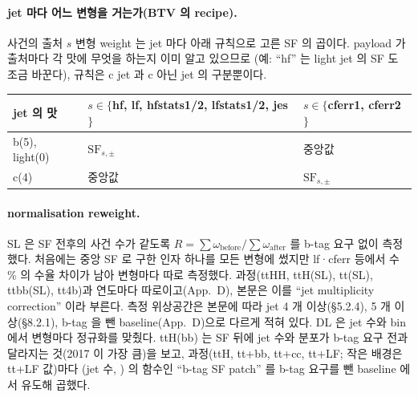 \paragraph{jet 마다 어느 변형을 거는가(BTV 의 recipe).}
사건의 출처 $s$ 변형 weight 는 jet 마다 아래 규칙으로 고른 SF 의 곱이다. payload 가 출처마다 각 맛에 무엇을 하는지 이미 알고 있으므로
(예: ``hf'' 는 light jet 의 SF 도 조금 바꾼다), 규칙은 c jet 과 c 아닌 jet 의 구분뿐이다.
\begin{center}\small
\begin{tabular}{@{}lll@{}}
\toprule
jet 의 맛 & $s\in\{$hf, lf, hfstats1/2, lfstats1/2, jes$\}$ & $s\in\{$cferr1, cferr2$\}$ \\
\midrule
b(5), light(0) & $\mathrm{SF}_{s,\pm}$ & 중앙값 \\
c(4) & 중앙값 & $\mathrm{SF}_{s,\pm}$ \\
\bottomrule
\end{tabular}
\end{center}

\paragraph{normalisation reweight.}
SL 은 SF 전후의 사건 수가 같도록 $R = \sum\omega_\text{before}/\sum\omega_\text{after}$ 를 b-tag 요구 없이 측정했다. 처음에는 중앙 SF 로 구한
인자 하나를 모든 변형에 썼지만 lf·cferr 등에서 수 \% 의 수율 차이가 남아 변형마다 따로 측정했다.
과정(ttHH, ttH(SL), tt(SL), ttbb(SL), tt4b)과 연도마다 따로이고(App.~D), 본문은 이를 ``jet multiplicity correction'' 이라 부른다. 측정
위상공간은 본문에 따라 jet 4 개 이상(§5.2.4), 5 개 이상(§8.2.1), b-tag 을 뺀 baseline(App.~D)으로 다르게 적혀 있다. DL 은 jet 수와 \HT{} bin 에서 변형마다 정규화를 맞췄다. ttH(bb) 는 SF 뒤에 jet 수와 \HT{} 분포가
b-tag 요구 전과 달라지는 것(2017 이 가장 큼)을 보고, 과정(ttH, tt+bb, tt+cc, tt+LF; 작은 배경은 tt+LF 값)마다 (jet 수, \HT) 의 함수인
``b-tag SF patch'' 를 b-tag 요구를 뺀 baseline 에서 유도해 곱했다.

